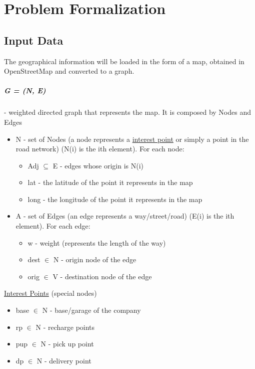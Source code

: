 \chapter{Problem Formalization}


\section{Input Data}
The geographical information will be loaded in the form of a map, obtained in OpenStreetMap and converted to a graph.
\paragraph{G = (N, E)} - weighted directed graph that represents the map. It is composed by Nodes and Edges
\begin{itemize}

	\item N - set of Nodes (a node represents a \uline{interest point} or simply a point in the road network) (N(i) is the ith element). For each node:
\begin{itemize}
	\item Adj $ \subseteq $  E - edges whose origin is N(i)
	\item lat - the latitude of the point it represents in the map
	\item long - the longitude of the point it represents in the map
\end{itemize}

	\item A - set of Edges (an edge represents a way/street/road) (E(i) is the ith element). For each edge:
\begin{itemize}
	\item w - weight (represents the length of the way)
	\item dest $ \in $  N - origin node of the edge
	\item orig $ \in $  V - destination node of the edge
\end{itemize}

\end{itemize}

\uline{Interest Points} (special nodes)
\begin{itemize}
	\item base $ \in $  N - base/garage of the company
	\item rp $ \in $  N - recharge points
	\item pup $ \in $  N - pick up point
	\item dp $ \in $  N - delivery point
\end{itemize}

